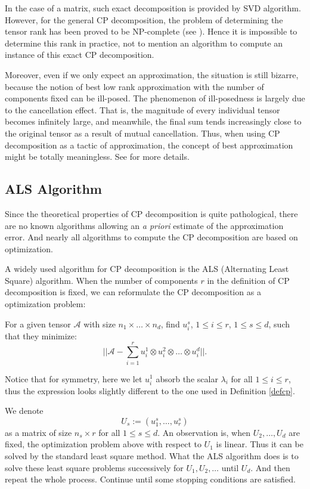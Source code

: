\documentclass[12pt]{article}
\begin{document}
In the case of a matrix, such exact decomposition is provided by SVD algorithm. However, for the general CP decomposition, the problem of determining the tensor rank has been proved to be NP-complete (see \cite{cpnpcomplete}). Hence it is impossible to determine this rank in practice, not to mention an algorithm to compute an instance of this exact CP decomposition.

Moreover, even if we only expect an approximation, the situation is still bizarre, because the notion of best low rank approximation with the number of components fixed can be ill-posed. The phenomenon of ill-posedness is largely due to the cancellation effect. That is, the magnitude of every individual tensor becomes infinitely large, and meanwhile, the final sum tends increasingly close to the original tensor as a result of mutual cancellation. Thus, when using CP decomposition as a tactic of approximation, the concept of best approximation might be totally meaningless. See \cite{cpill} for more details.

\subsection{ALS Algorithm}
Since the theoretical properties of CP decomposition is quite pathological, there are no known algorithms allowing an \textit{a priori} estimate of the approximation error. And nearly all algorithms to compute the CP decomposition are based on optimization.

A widely used algorithm for CP decomposition is the ALS (Alternating Least Square) algorithm. When the number of components $r$ in the definition of CP decomposition is fixed, we can reformulate the CP decomposition as a optimization problem:

\begin{myprob}
For a given tensor $\mathcal{A}$ with size $n_1 \times \dots \times n_d$,
find $u_i^s$, $1 \leq i \leq r$, $1 \leq s \leq d$, such that they minimize: 
 $$|| \mathcal{A} - \sum_{i = 1}^r u_i^1 \otimes u_i^2 \otimes \dots \otimes u_i^d ||.$$
\end{myprob}

Notice that for symmetry, here we let $u_i^1$ absorb the scalar $\lambda_i$ for all $1 \leq i \leq r$, thus the expression looks slightly different to the one used in Definition \ref{defcp}.

We denote 
$$U_s := (u_1^s, \dots, u_r^s)$$ 
as a matrix of size $n_s \times r$ for all $1 \leq s \leq d$. An observation is, when $U_2, \dots, U_d$ are fixed, the optimization problem above with respect to $U_1$ is linear. Thus it can be solved by the standard least square method. What the ALS algorithm does is to solve these least square problems successively for $U_1, U_2, \dots$ until $U_d$. And then repeat the whole process. Continue until some stopping conditions are satisfied.
\end{document}
